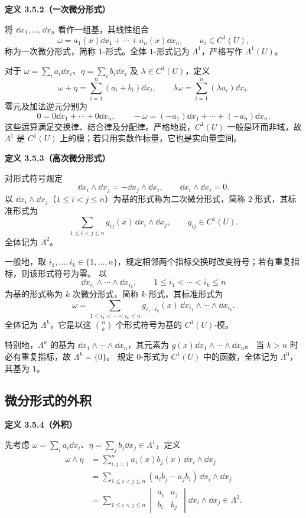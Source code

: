 \textbf{定义 3.5.2（一次微分形式）}


将 $\dd x_1,\ldots,\dd x_n$ 看作一组基，其线性组合
\[
\omega=a_1(x)\dd x_1+\cdots+a_n(x)\dd x_n,
\qquad a_i\in C^1(U),
\]
称为一次微分形式，简称 $1$-形式。全体 $1$-形式记为 $\Lambda^1$，严格写作 $\Lambda^1(U)$。




对于 $\omega=\sum_i a_i\dd x_i$、$\eta=\sum_i b_i\dd x_i$ 及 $\lambda\in C^1(U)$，定义
\[
\omega+\eta=\sum_{i=1}^n(a_i+b_i)\dd x_i,\qquad
\lambda\omega=\sum_{i=1}^n(\lambda a_i)\dd x_i.
\]
零元及加法逆元分别为
\[
0=0\dd x_1+\cdots+0\dd x_n,\qquad
-\omega=(-a_1)\dd x_1+\cdots+(-a_n)\dd x_n.
\]
这些运算满足交换律、结合律及分配律。严格地说，$C^1(U)$ 一般是环而非域，故 $\Lambda^1$ 是 $C^1(U)$ 上的模；若只用实数作标量，它也是实向量空间。



\textbf{定义 3.5.3（高次微分形式）}


对形式符号规定
\[
\dd x_i\wedge\dd x_j=-\dd x_j\wedge\dd x_i,\qquad
\dd x_i\wedge\dd x_i=0.
\]
以 $\dd x_i\wedge\dd x_j$（$1\le i<j\le n$）为基的形式称为二次微分形式，简称 $2$-形式，其标准形式为
\[
\sum_{1\le i<j\le n}g_{ij}(x)\,\dd x_i\wedge\dd x_j,
\qquad g_{ij}\in C^1(U).
\]
全体记为 $\Lambda^2$。

一般地，取 $i_1,\ldots,i_k\in\{1,\ldots,n\}$，规定相邻两个指标交换时改变符号；若有重复指标，则该形式符号为零。
以
\[
\dd x_{i_1}\wedge\cdots\wedge\dd x_{i_k},
\qquad 1\le i_1<\cdots<i_k\le n
\]
为基的形式称为 $k$ 次微分形式，简称 $k$-形式，其标准形式为
\[
\omega=\sum_{1\le i_1<\cdots<i_k\le n}
g_{i_1\cdots i_k}(x)\,\dd x_{i_1}\wedge\cdots\wedge\dd x_{i_k}.
\]
全体记为 $\Lambda^k$，它是以这 $\binom nk$ 个形式符号为基的 $C^1(U)$-模。




特别地，$\Lambda^n$ 的基为 $\dd x_1\wedge\cdots\wedge\dd x_n$，其元素为 $g(x)\dd x_1\wedge\cdots\wedge\dd x_n$。
当 $k>n$ 时必有重复指标，故 $\Lambda^k=\{0\}$。
规定 $0$-形式为 $C^1(U)$ 中的函数，全体记为 $\Lambda^0$，其基为 $1$。

\subsection*{微分形式的外积}



\textbf{定义 3.5.4（外积）}


先考虑 $\omega=\sum_i a_i\dd x_i$、$\eta=\sum_j b_j\dd x_j\in\Lambda^1$，定义
\[
\begin{aligned}
\omega\wedge\eta
&=\sum_{i,j=1}^n a_i(x)b_j(x)\,\dd x_i\wedge\dd x_j\\
&=\sum_{1\le i<j\le n}(a_i b_j-a_j b_i)\,\dd x_i\wedge\dd x_j\\
&=\sum_{1\le i<j\le n}\begin{vmatrix}a_i&a_j\\b_i&b_j\end{vmatrix}
\dd x_i\wedge\dd x_j\in\Lambda^2.
\end{aligned}
\]

